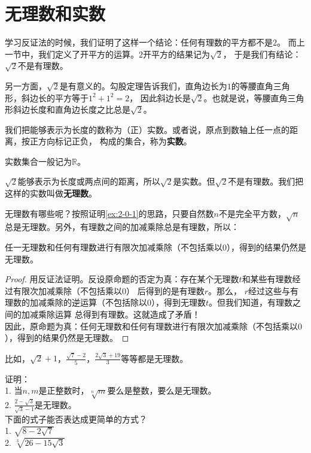\documentclass[12pt,UTF8]{ctexbook}
\begin{document}
\section{无理数和实数}
学习反证法的时候，我们证明了这样一个结论：任何有理数的平方都不是$2$。
而上一节中，我们定义了开平方的运算。$2$开平方的结果记为$\sqrt{2}$，
于是我们有结论：$\sqrt{2}$不是有理数。

另一方面，$\sqrt{2}$是有意义的。勾股定理告诉我们，直角边长为$1$的等腰直角三角形，斜边长的平方等于$1^2+1^2=2$，
因此斜边长是$\sqrt{2}$。也就是说，等腰直角三角形斜边长度和直角边长度之比总是$\sqrt{2}$。

我们把能够表示为长度的数称为（正）实数。或者说，原点到数轴上任一点的距离，按正方向标记正负，
构成的集合，称为\textbf{实数}。

实数集合一般记为$\mathbb{R}$。

$\sqrt{2}$能够表示为长度或两点间的距离，所以$\sqrt{2}$是实数。但$\sqrt{2}$不是有理数。我们把这样的实数叫做\textbf{无理数}。

无理数有哪些呢？按照证明\ref{ex:2-0-1}的思路，只要自然数$n$不是完全平方数，$\sqrt{n}$总是无理数。另外，有理数之间的加减乘除总是有理数，所以：
\begin{tm}\label{tm:3-1-0}
    任一无理数和任何有理数进行有限次加减乘除（不包括乘以$0$），得到的结果仍然是无理数。
\end{tm}
\begin{proof}
    用反证法证明。反设原命题的否定为真：存在某个无理数$t$和某些有理数经过有限次加减乘除（不包括乘以$0$）
    后得到的是有理数$r$。那么，
    $r$经过这些与有理数的加减乘除的逆运算（不包括除以$0$），得到无理数$t$。但我们知道，有理数之间的加减乘除运算
    总得到有理数。这就造成了矛盾！\\
    因此，原命题为真：任何无理数和任何有理数进行有限次加减乘除（不包括乘以$0$），得到的结果仍然是无理数。
\end{proof}

比如，$\sqrt{2}+1$，$\displaystyle\frac{\sqrt{7} - 2}{5}$，$\displaystyle\frac{2\sqrt{3} + 19}{3}$等等都是无理数。

\begin{xt}\label{xt:3-1-0}
    证明：\\
    1. 当$n,m$是正整数时，$\sqrt[n]{m}$要么是整数，要么是无理数。\\
    2. $\displaystyle\frac{2 - \sqrt{3}}{\sqrt{3} - 1}$是无理数。\\
    下面的式子能否表达成更简单的方式？\\
    1. $\sqrt{8 - 2\sqrt{7}}$\\
    2. $\sqrt[3]{26 - 15\sqrt{3}}$
\end{xt}
\end{document}
